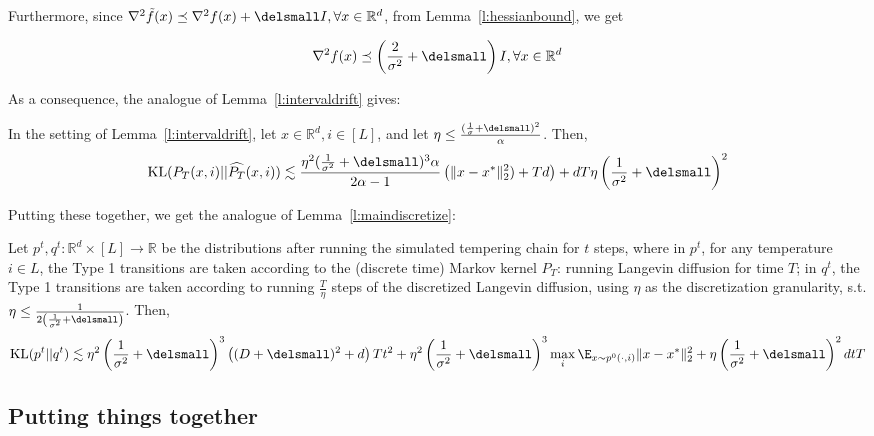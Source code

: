 Furthermore, since $\nabla^2 \tilde{f}(x) \preceq \nabla^2 f(x) + \delsmall I, \forall x \in \mathbb{R}^d$, from Lemma~\ref{l:hessianbound}, we get

\begin{lem}[Perturbed Hessian bound] %
$$\nabla^2 f(x) \preceq \left(\frac{2}{\sigma^2} + \delsmall\right)I , \forall x \in \mathbb{R}^d$$ 
\end{lem}

As a consequence, the analogue of Lemma~\ref{l:intervaldrift} gives: 
\begin{lem} In the setting of Lemma~\ref{l:intervaldrift}, let $x \in \mathbb{R}^d, i \in [L]$, and let $\eta \leq \frac{(\frac{1}{\sigma} + \delsmall)^2}{\alpha}$. Then,
$$\mbox{KL}(P_T(x, i) || \widehat{P_T}(x,i)) \lesssim \frac{\eta^2 (\frac{1}{\sigma^2} + \delsmall)^3 \alpha}{ 2\alpha - 1} \left(\|x - x^*\|_2^2) + Td\right) + d T \eta\left(\frac{1}{\sigma^2} + \delsmall\right)^2$$
\end{lem}    

Putting these together, we get the analogue of Lemma~\ref{l:maindiscretize}: 
\begin{lem}  Let $p^t, q^t: \mathbb{R}^d \times [L]  \to \mathbb{R}$ be the distributions after running the simulated tempering chain for $t$ steps, where in $p^t$, for any temperature $i \in L$, the Type 1 transitions are taken according to the (discrete time) Markov kernel $P_T$: running Langevin diffusion for time $T$; in $q^t$, the Type 1 transitions are taken according to running $\frac{T}{\eta}$ steps of the discretized Langevin diffusion, using $\eta$ as the discretization granularity, s.t. $\eta \leq \frac{1}{2\left(\frac{1}{\sigma^2} + \delsmall\right)}$.  
Then, 
\begin{align*} \mbox{KL} (p^t || q^t) \lesssim \eta^2 \left(\frac{1}{\sigma^2} + \delsmall\right)^3 \left((D + \delsmall)^2+d\right) T t^2 + \eta^2 \left(\frac{1}{\sigma^2} + \delsmall\right)^3  \max_i \E_{x \sim p^0( \cdot, i)}\|x - x^*\|_2^2 + \eta\left(\frac{1}{\sigma^2} + \delsmall\right)^2  d t T  \end{align*} 
\label{l:maindiscretize-perturb}
\end{lem} 

\subsection{Putting things together} 

